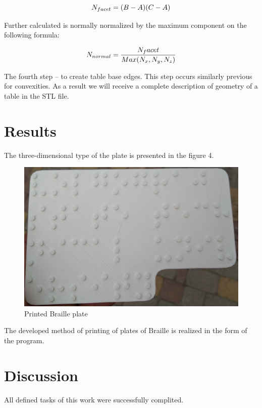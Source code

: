 \documentclass[journal,article,submit,moreauthors,pdftex,10pt,a4paper]{mdpi}
\begin{document}
\begin{equation}
\mathnormal{N_{facet}=(B-A)(C-A)}
\end{equation}

Further calculated is normally normalized by the maximum component on the following formula:

\begin{equation}
\mathnormal{N_{normal}=\frac{N_facet}{Max(N_{x},N_{y},N_{z})}}
\end{equation}

The fourth step – to create table base edges. This step occurs similarly previous for convexities.
As a result we will receive a complete description of geometry of a table in the STL file.


\section{Results}

The three-dimensional type of the plate is presented in the figure 4.

\begin{figure}[H]
\centering
\includegraphics[width=10 cm]{Braille-plate-foto.jpg}
\caption{Printed Braille plate}
\end{figure} 

The developed method of printing of plates of Braille is realized in the form of the program. 


\section{Discussion}

All defined tasks of this work were successfully complited. 
\end{document}
